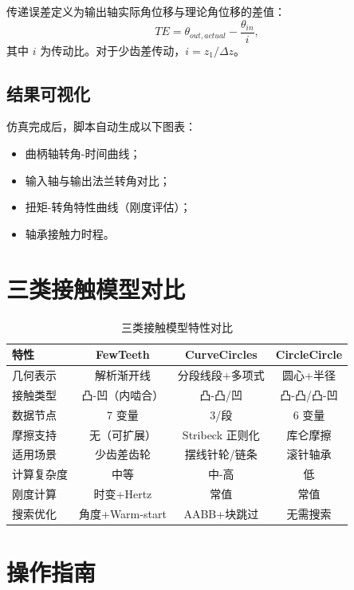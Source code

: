 \documentclass[12pt]{ctexart}
\begin{document}
传递误差定义为输出轴实际角位移与理论角位移的差值：
\begin{equation}
TE = \theta_{out,actual} - \frac{\theta_{in}}{i},
\end{equation}
其中 $i$ 为传动比。对于少齿差传动，$i = z_1 / \Delta z$。

\subsection{结果可视化}

仿真完成后，脚本自动生成以下图表：
\begin{itemize}
  \item 曲柄轴转角-时间曲线；
  \item 输入轴与输出法兰转角对比；
  \item 扭矩-转角特性曲线（刚度评估）；
  \item 轴承接触力时程。
\end{itemize}

\section{三类接触模型对比}

\begin{table}[htbp]
\centering
\small
\begin{tabular}{lccc}
\toprule
特性 & FewTeeth & CurveCircles & CircleCircle \\ 
\midrule
几何表示 & 解析渐开线 & 分段线段+多项式 & 圆心+半径 \\ 
接触类型 & 凸-凹（内啮合） & 凸-凸/凹 & 凸-凸/凸-凹 \\ 
数据节点 & 7 变量 & 3/段 & 6 变量 \\ 
摩擦支持 & 无（可扩展） & Stribeck 正则化 & 库仑摩擦 \\ 
适用场景 & 少齿差齿轮 & 摆线针轮/链条 & 滚针轴承 \\ 
计算复杂度 & 中等 & 中-高 & 低 \\ 
刚度计算 & 时变+Hertz & 常值 & 常值 \\ 
搜索优化 & 角度+Warm-start & AABB+块跳过 & 无需搜索 \\ 
\bottomrule
\end{tabular}
\caption{三类接触模型特性对比}
\end{table}

\section{操作指南}
\end{document}
